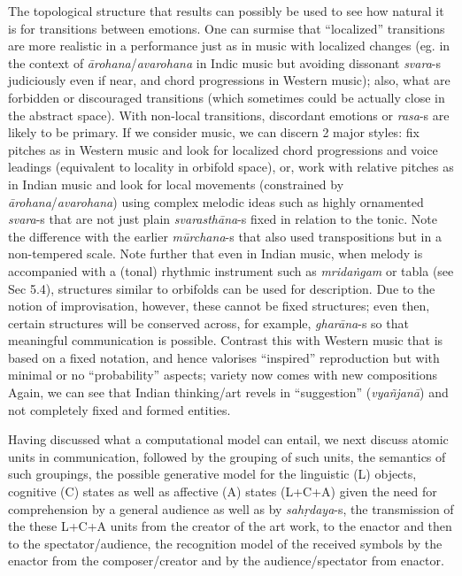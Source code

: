 The topological structure that results can possibly be used to see how natural it is for transitions between emotions. One can surmise that “localized” transitions are more realistic in a performance just as in music with localized changes (eg. in the context of \textsl{ārohana}/\textsl{avarohana} in Indic music but avoiding dissonant \textsl{svara}-s judiciously even if near, and chord progressions in Western music); also, what are forbidden or discouraged transitions (which sometimes could be actually close in the abstract space). With non-local transitions, discordant emotions or \textsl{rasa}-s are likely to be primary. If we consider music, we can discern 2 major styles: fix pitches as in Western music and look for localized chord progressions and voice leadings (equivalent to locality in orbifold space), or, work with relative pitches as in Indian music and look for local movements (constrained by \textsl{ārohana}/\textsl{avarohana}) using complex melodic ideas such as highly ornamented \textsl{svara}-s that are not just plain \textsl{svarasthāna}-s fixed in relation to the tonic. Note the difference with the earlier \textsl{mūrchana}-s that also used transpositions but in a non-tempered scale. Note further that even in Indian music, when melody is accompanied with a (tonal) rhythmic instrument such as \textsl{mridaṅgam} or tabla (see Sec 5.4), structures similar to orbifolds can be used for description. Due to the notion of improvisation, however, these cannot be fixed structures; even then, certain structures will be conserved across, for example, \textsl{gharāna}-s so that meaningful communication is possible. Contrast this with Western music that is based on a fixed notation, and hence valorises “inspired” reproduction but with minimal or no “probability” aspects; variety now comes with new compositions Again, we can see that Indian thinking/art revels in “suggestion” (\textsl{vyañjanā}) and not completely fixed and formed entities.

Having discussed what a computational model can entail, we next discuss atomic units in communication, followed by the grouping of such units, the semantics of such groupings, the possible generative model for the linguistic (L) objects, cognitive (C) states as well as affective (A) states (L+C+A) given the need for comprehension by a general audience as well as by \textsl{sahṛdaya}-s, the transmission of the these L+C+A units from the creator of the art work, to the enactor and then to the spectator/audience, the recognition model of the received symbols by the enactor from the composer/creator and by the audience/spectator from enactor.

